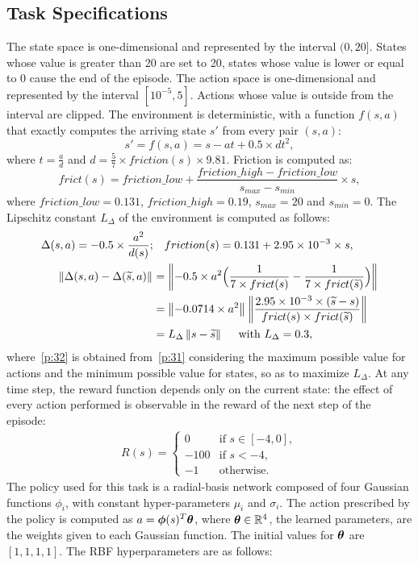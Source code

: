 \subsection*{Task Specifications}
The state space is one-dimensional and represented by the interval $(0,20]$. States whose value is greater than 20 are set to 20, states whose value is lower or equal to 0 cause the end of the episode. The action space is one-dimensional and represented by the interval $[10^{-5}, 5]$. Actions whose value is outside from the interval are clipped. The environment is deterministic, with a function $f(s,a)$ that exactly computes the arriving state $s'$ from every pair $(s,a)$:
\[
s'=f(s,a) = s - at + 0.5 \times dt^2,
\]
where $t=\frac{a}{d}$ and $d = \frac{5}{7} \times friction(s) \times 9.81$.
Friction is computed as:
\[
frict(s) = friction\_low + \frac{friction\_high - friction\_low}{s_{max} - s_{min}} \times s,
\]
where $friction\_low=0.131$, $friction\_high=0.19$, $s_{max}=20$ and $s_{min}=0$. The Lipschitz constant $L_{\Delta}$ of the environment is computed as follows:\\
\begin{align}
\Delta(s,a) = -0.5 \times \frac{a^2}{d(s)}; &\quad friction(s) = 0.131 + 2.95 \times 10^{-3} \times s, \nonumber\\
\left\|\Delta(s,a) - \Delta(\widetilde{s},a)\right\|_{} &= \left\| -0.5 \times a^2 \Big(\frac{1}{7 \times frict(s)} - \frac{1}{7 \times frict(\widetilde{s})} \Big)\right\|_{} \nonumber\\
&= \left\|-0.0714 \times a^2\right\|_{}\left\|\frac {2.95 \times 10^{-3} \times (\widetilde{s} -s)} {frict(s) \times frict(\widetilde{s})}\right\|_{}\label{p:31}\\
&= L_{\Delta} \left\|s - \widetilde{s}\right\|_{} \quad \text{ with }L_{\Delta}=0.3, \label{p:32}
\end{align}
where~\eqref{p:32} is obtained from~\eqref{p:31} considering the maximum possible value for actions and the minimum possible value for states, so as to maximize $L_{\Delta}$.
At any time step, the reward function depends only on the current state: the effect of every action performed is observable in the reward of the next step of the episode: 
\begin{align}
R(s) = 
\begin{cases}
0 & \text{if } s \in [-4,0],\\
-100 & \text{if } s < -4,\\
-1 & \text{otherwise}.
\end{cases} \nonumber
\end{align}
The policy used for this task is a radial-basis network composed of four Gaussian functions $\phi_i$, with constant hyper-parameters $\mu_i$ and $\sigma_i$. The action prescribed by the policy is computed as $a = \boldsymbol{\phi}(s)^T\boldsymbol{\theta}$, where $\boldsymbol{\theta}\in\mathbb{R}^4$, the learned parameters, are the weights given to each Gaussian function. The initial values for $\boldsymbol{\theta}$ are $[1, 1, 1, 1]$. The RBF hyperparameters are as follows: 
